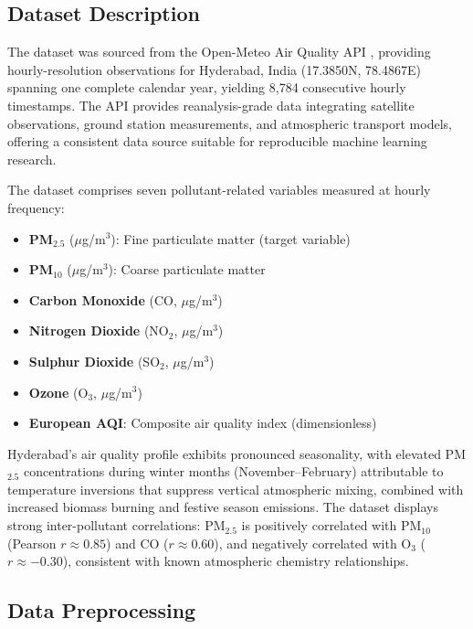\documentclass[conference]{IEEEtran}
\begin{document}
\subsection{Dataset Description}

The dataset was sourced from the Open-Meteo Air Quality API \cite{openmeteo}, providing hourly-resolution observations for Hyderabad, India (17.3850\textdegree N, 78.4867\textdegree E) spanning one complete calendar year, yielding 8,784 consecutive hourly timestamps. The API provides reanalysis-grade data integrating satellite observations, ground station measurements, and atmospheric transport models, offering a consistent data source suitable for reproducible machine learning research.

The dataset comprises seven pollutant-related variables measured at hourly frequency:

\begin{itemize}
\item \textbf{PM$_{2.5}$} ($\mu$g/m$^{3}$): Fine particulate matter (target variable)
\item \textbf{PM$_{10}$} ($\mu$g/m$^{3}$): Coarse particulate matter
\item \textbf{Carbon Monoxide} (CO, $\mu$g/m$^{3}$)
\item \textbf{Nitrogen Dioxide} (NO$_{2}$, $\mu$g/m$^{3}$)
\item \textbf{Sulphur Dioxide} (SO$_{2}$, $\mu$g/m$^{3}$)
\item \textbf{Ozone} (O$_{3}$, $\mu$g/m$^{3}$)
\item \textbf{European AQI}: Composite air quality index (dimensionless)
\end{itemize}

Hyderabad's air quality profile exhibits pronounced seasonality, with elevated PM$_{2.5}$ concentrations during winter months (November--February) attributable to temperature inversions that suppress vertical atmospheric mixing, combined with increased biomass burning and festive season emissions. The dataset displays strong inter-pollutant correlations: PM$_{2.5}$ is positively correlated with PM$_{10}$ (Pearson $r \approx 0.85$) and CO ($r \approx 0.60$), and negatively correlated with O$_{3}$ ($r \approx -0.30$), consistent with known atmospheric chemistry relationships.

\subsection{Data Preprocessing}
\end{document}
